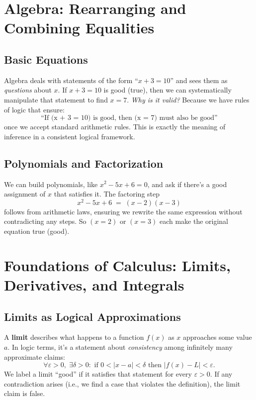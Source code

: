 \documentclass[12pt]{article}
\begin{document}
\section{Algebra: Rearranging and Combining Equalities}
\label{sec:algebra}

\subsection{Basic Equations}
Algebra deals with statements of the form ``$x + 3 = 10$'' and sees
them as \emph{questions} about $x$. If $x + 3 = 10$ is good (true),
then we can systematically manipulate that statement to find $x = 7$.
\emph{Why is it valid?} Because we have rules of logic that ensure:
\[
\text{``If (x + 3 = 10) is good, then (x = 7) must also be good''}
\]
once we accept standard arithmetic rules. This is exactly the meaning
of inference in a consistent logical framework.

\subsection{Polynomials and Factorization}
We can build polynomials, like $x^2 - 5x + 6 = 0$, and ask if there's
a good assignment of $x$ that satisfies it. The factoring step
\[
x^2 - 5x + 6 \;=\; (x-2)(x-3)
\]
follows from arithmetic laws, ensuring we rewrite the same expression
without contradicting any steps. So $(x=2)$ or $(x=3)$ each make the
original equation true (good).

\section{Foundations of Calculus: Limits, Derivatives, and Integrals}
\label{sec:calculus}

\subsection{Limits as Logical Approximations}
A \textbf{limit} describes what happens to a function $f(x)$ as $x$
approaches some value $a$. In logic terms, it's a statement about
\emph{consistency} among infinitely many approximate claims:
\[
\forall \varepsilon>0,\; \exists \delta>0:
   \text{ if } 0 < |x - a| < \delta \text{ then } |f(x) - L| < \varepsilon.
\]
We label a limit ``good'' if it satisfies that statement for every
$\varepsilon>0$. If any contradiction arises (i.e., we find a case
that violates the definition), the limit claim is false.
\end{document}
